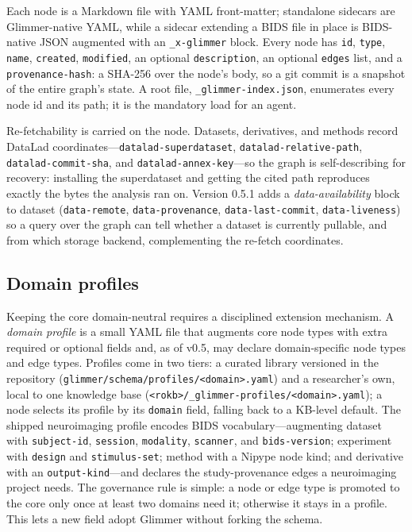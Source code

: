 \documentclass[preprint]{glimmer-paper}
\newcommand{\code}[1]{\texttt{#1}}
\newcommand{\node}[1]{\textsf{#1}}
\begin{document}
Each node is a Markdown file with YAML front-matter; standalone sidecars are
Glimmer-native YAML, while a sidecar extending a BIDS file in place is BIDS-native JSON
augmented with an \code{\_x-glimmer} block. Every node has \code{id}, \code{type},
\code{name}, \code{created}, \code{modified}, an optional \code{description}, an optional
\code{edges} list, and a \code{provenance-hash}: a SHA-256 over the node's body, so a git
commit is a snapshot of the entire graph's state. A root file, \code{\_glimmer-index.json},
enumerates every node id and its path; it is the mandatory load for an agent.

Re-fetchability is carried on the node. Datasets, derivatives, and methods record DataLad
coordinates---\code{datalad-superdataset}, \code{datalad-relative-path},
\code{datalad-commit-sha}, and \code{datalad-annex-key}---so the graph is self-describing
for recovery: installing the superdataset and getting the cited path reproduces exactly
the bytes the analysis ran on. Version 0.5.1 adds a \emph{data-availability} block to
\node{dataset} (\code{data-remote}, \code{data-provenance}, \code{data-last-commit},
\code{data-liveness}) so a query over the graph can tell whether a dataset is currently
pullable, and from which storage backend, complementing the re-fetch coordinates.

\subsection{Domain profiles}
\label{sec:profiles}

Keeping the core domain-neutral requires a disciplined extension mechanism. A
\emph{domain profile} is a small YAML file that augments core node types with extra
required or optional fields and, as of v0.5, may declare domain-specific node types and
edge types. Profiles come in two tiers: a curated library versioned in the repository
(\code{glimmer/schema/profiles/<domain>.yaml}) and a researcher's own, local to one
knowledge base (\code{<rokb>/\_glimmer-profiles/<domain>.yaml}); a node selects its profile
by its \code{domain} field, falling back to a KB-level default. The shipped neuroimaging
profile encodes BIDS vocabulary---augmenting \node{dataset} with \code{subject-id},
\code{session}, \code{modality}, \code{scanner}, and \code{bids-version}; \node{experiment}
with \code{design} and \code{stimulus-set}; \node{method} with a Nipype node kind; and
\node{derivative} with an \code{output-kind}---and declares the study-provenance edges a
neuroimaging project needs. The governance rule is simple: a node or edge type is promoted
to the core only once at least two domains need it; otherwise it stays in a profile. This
lets a new field adopt Glimmer without forking the schema.
\end{document}
